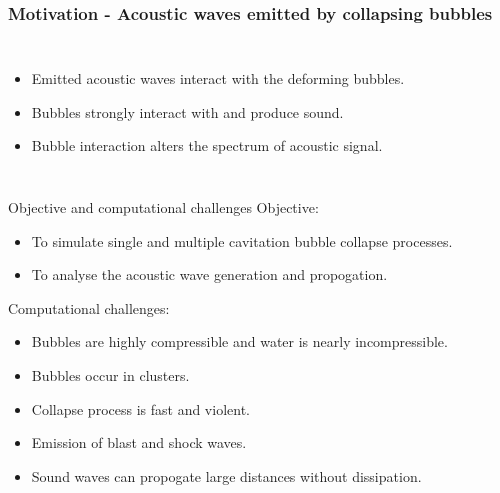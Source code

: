 \documentclass[10pt, aspectratio=169]{beamer}
\begin{document}
\begin{frame}
	\frametitle{Motivation - Acoustic waves emitted by collapsing bubbles}
	\begin{columns}
		\begin{itemize}
			\item Emitted acoustic waves interact with the deforming bubbles.
			\item Bubbles strongly interact with and produce sound.
			\item Bubble interaction alters the spectrum of acoustic signal.
		\end{itemize}
							
	\end{columns}
\end{frame}

\begin{frame}{Objective and computational challenges}
	Objective:
	\begin{itemize}
		\item To simulate single and multiple cavitation bubble collapse processes.
		\item To analyse the acoustic wave generation and propogation.
	\end{itemize}
	Computational challenges:
	\begin{itemize}
		\item Bubbles are highly compressible and water is nearly incompressible.
		\item Bubbles occur in clusters.
		\item Collapse process is fast and violent.
		\item Emission of blast and shock waves.
		\item Sound waves can propogate large distances without dissipation.
	\end{itemize}
\end{frame}
\end{document}
